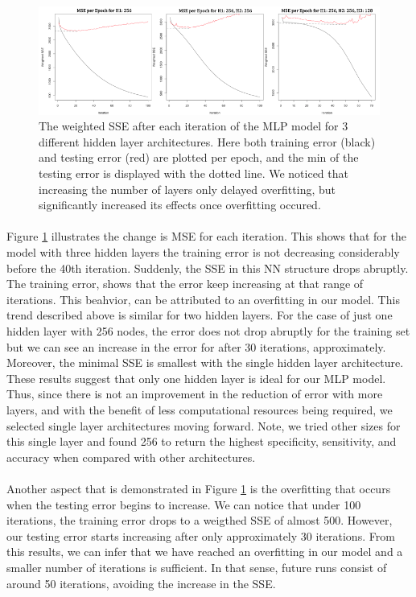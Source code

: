 \documentclass[11.5pt]{article}
\newcounter{Figure}
\newcounter{graphics}
\begin{document}
\begin{figure}[h!]
\centerline{\includegraphics[width=1\textwidth]{report_mlp/MSEperEpochMLP.png}}
  \caption{\small  The weighted SSE after each iteration of the MLP model for 3 different hidden layer architectures. Here both training error (black) and testing error (red) are plotted per epoch, and the min of the testing error is displayed with the dotted line. We noticed that increasing the number of layers only delayed overfitting, but significantly increased its effects once overfitting occured.  }
\label{MSEperEpochMLP}
\end{figure}
 
\paragraph{} Figure \ref{MSEperEpochMLP} illustrates the change is MSE for each iteration. This shows that for the model with three hidden layers the training error is not decreasing considerably before the 40th iteration. Suddenly, the SSE in this NN structure drops abruptly. The training error, shows that the error keep increasing at that range of iterations. This beahvior, can be attributed to an overfitting in our model.  This trend described above is similar for two hidden layers. For the case of just one hidden layer with 256 nodes, the error does not drop abruptly for the training set but we can see an increase in the error for after 30 iterations, approximately. Moreover, the minimal SSE is smallest with the single hidden layer architecture. These results suggest that only one hidden layer is ideal for our MLP model. Thus, since there is not an improvement in the reduction of error with more layers, and with the benefit of less computational resources being required, we selected single layer architectures moving forward. Note, we tried other sizes for this single layer and found 256 to return the highest specificity, sensitivity, and accuracy when compared with other architectures. 
 
\paragraph{} Another aspect that is demonstrated in Figure \ref{MSEperEpochMLP} is the overfitting that occurs when the testing error begins to increase. We can notice that under 100 iterations, the training error drops to a weigthed SSE of almost 500. However, our testing error starts increasing after only approximately 30 iterations. From this results, we can infer that we have reached an overfitting in our model and a smaller number of iterations is sufficient. In that sense, future runs consist of around 50 iterations, avoiding the increase in the SSE.
\end{document}

